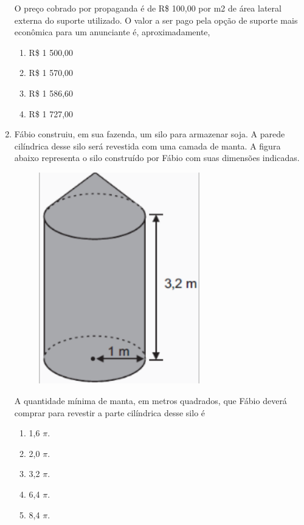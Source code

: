 \documentclass[twocolumn,oneside,a4paper,12.0pt]{article}
\begin{document}
\begin{enumerate}
O preço cobrado por propaganda é de R\$ 100,00 por m2 de área lateral externa do suporte utilizado.	O valor a ser pago pela opção de suporte mais econômica para um anunciante é, aproximadamente,
	
\begin{enumerate}
\item R\$ 1 500,00
\item R\$ 1 570,00
\item R\$ 1 586,60
\item R\$ 1 727,00 
\end{enumerate}


\item Fábio construiu, em sua fazenda, um silo para armazenar soja. A parede cilíndrica desse silo será revestida com uma camada de manta. A figura abaixo representa o silo construído por Fábio com suas dimensões indicadas.

	\begin{figure}[!htb]
	\center
	\includegraphics[width=7cm]{Extras/a6.png}
	\end{figure}

A quantidade mínima de manta, em metros quadrados, que Fábio deverá comprar para revestir a parte cilíndrica desse silo é 

\begin{enumerate}
\item 1,6 $\pi$. 
\item 2,0 $\pi$. 
\item 3,2 $\pi$. 
\item 6,4 $\pi$. 
\item 8,4 $\pi$. 
\end{enumerate}


\end{enumerate}
\end{document}
